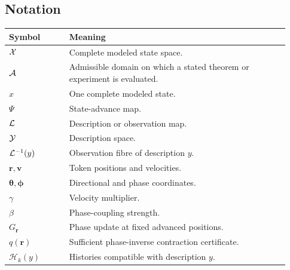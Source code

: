 \subsection{Notation}

\begin{longtable}{@{}p{0.20\linewidth}p{0.73\linewidth}@{}}
\toprule
Symbol & Meaning\\
\midrule
\endhead
\(\mathcal X\) & Complete modeled state space.\\
\(\mathcal A\) & Admissible domain on which a stated theorem or experiment is evaluated.\\
\(x\) & One complete modeled state.\\
\(\Psi\) & State-advance map.\\
\(\mathcal L\) & Description or observation map.\\
\(\mathcal Y\) & Description space.\\
\(\mathcal L^{-1}(y)\) & Observation fibre of description \(y\).\\
\(\bm r,\bm v\) & Token positions and velocities.\\
\(\bm\theta,\bm\phi\) & Directional and phase coordinates.\\
\(\gamma\) & Velocity multiplier.\\
\(\beta\) & Phase-coupling strength.\\
\(G_{\bm r}\) & Phase update at fixed advanced positions.\\
\(q(\bm r)\) & Sufficient phase-inverse contraction certificate.\\
\(\mathcal H_k(y)\) & Histories compatible with description \(y\).\\
\bottomrule
\end{longtable}
